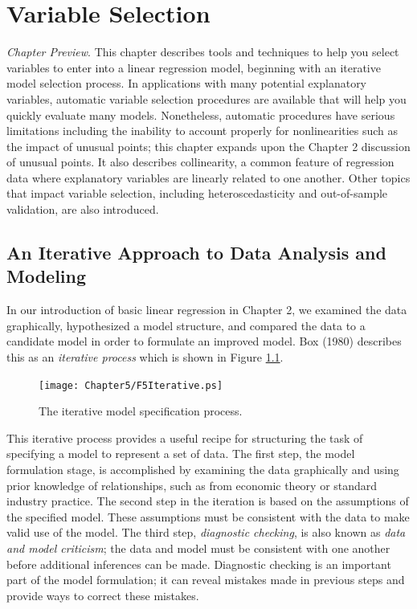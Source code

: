 \setcounter{chapter}{4}

\chapter{Variable Selection}

{\small \textit{Chapter Preview}. This chapter describes tools and
techniques to help you select variables to enter into a linear
regression model, beginning with an iterative model selection
process. In applications with many potential explanatory variables,
automatic variable selection procedures are available that will help
you quickly evaluate many models. Nonetheless, automatic procedures
have serious limitations including the inability to account properly
for nonlinearities such as the impact of unusual points; this
chapter expands upon the Chapter 2 discussion of unusual points. It
also describes collinearity, a common feature of regression data
where explanatory variables are linearly related to one another.
Other topics that impact variable selection, including
heteroscedasticity and out-of-sample validation, are also
introduced.}

\section{An Iterative Approach to Data Analysis and
Modeling}\label{S5:Iterative}

In our introduction of basic linear regression in Chapter 2, we
examined the data graphically, hypothesized a model structure, and
compared the data to a candidate model in order to formulate an
improved model. Box (1980) describes this as an \emph{iterative
process} which is shown in Figure \ref{F5:Iterative}.


\begin{figure}[htp]
    \texttt{[image: Chapter5/F5Iterative.ps]}
   \caption{\label{F5:Iterative} \small The iterative model specification process.}
\end{figure}


This iterative process provides a useful recipe for structuring the
task of specifying a model to represent a set of data. The first
step, the model formulation stage, is accomplished by examining the
data graphically and using prior knowledge of relationships, such as
from economic theory or standard industry practice. The second step
in the iteration is based on the assumptions of the specified model.
These assumptions must be consistent with the data to make valid use
of the model. The third step, \emph{diagnostic checking}, is also
known as \emph{data and model criticism}; the data and model must be
consistent with one another before additional inferences can be
made. Diagnostic checking is an important part of the model
formulation; it can reveal mistakes made in previous steps and
provide ways to correct these mistakes.

